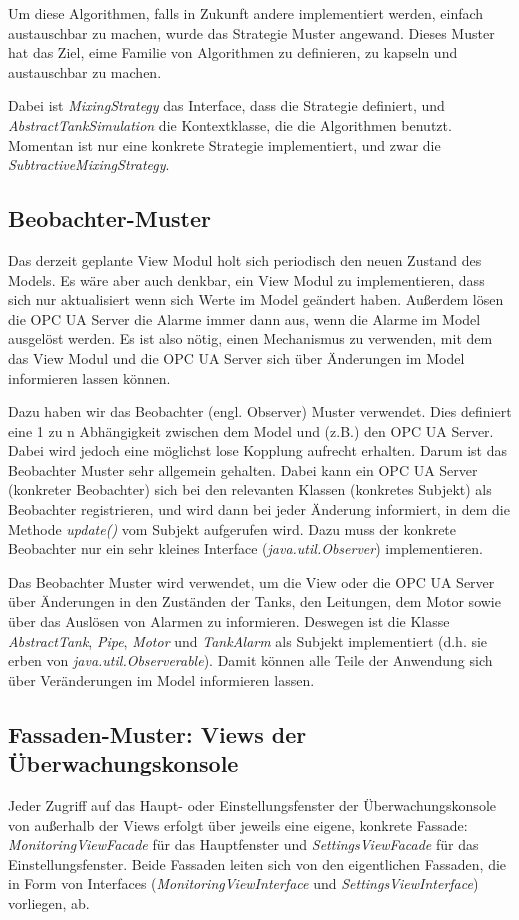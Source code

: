 \documentclass[parskip=full]{scrartcl}
\begin{document}
Um diese Algorithmen, falls in Zukunft andere implementiert werden, einfach austauschbar zu machen, wurde
das Strategie Muster angewand. Dieses Muster hat das Ziel, eime Familie von Algorithmen zu definieren, zu kapseln und austauschbar zu machen.

Dabei ist \emph{MixingStrategy} das Interface, dass die Strategie definiert, und \emph{AbstractTankSimulation} die Kontextklasse, die die Algorithmen
benutzt. Momentan ist nur eine konkrete Strategie implementiert, und zwar die \emph{SubtractiveMixingStrategy}.

\subsection{Beobachter-Muster}
Das derzeit geplante View Modul holt sich periodisch den neuen Zustand des Models. Es wäre aber auch denkbar, ein View Modul zu implementieren,
dass sich nur aktualisiert wenn sich Werte im Model geändert haben. Außerdem lösen die OPC UA Server die Alarme immer dann aus, wenn die Alarme im Model
ausgelöst werden. Es ist also nötig, einen Mechanismus zu verwenden, mit dem das View Modul und die OPC UA Server sich über Änderungen im Model informieren
lassen können.

Dazu haben wir das Beobachter (engl. Observer) Muster verwendet. Dies definiert eine 1 zu n Abhängigkeit zwischen dem Model und (z.B.) den OPC UA Server.
Dabei wird jedoch eine möglichst lose Kopplung aufrecht erhalten. Darum ist das Beobachter Muster sehr allgemein gehalten. Dabei kann ein OPC UA Server (konkreter Beobachter)
sich bei den relevanten Klassen (konkretes Subjekt) als Beobachter registrieren, und wird dann bei jeder Änderung informiert, in dem die Methode \emph{update()}
vom Subjekt aufgerufen wird. Dazu muss der konkrete Beobachter nur ein sehr kleines Interface (\emph{java.util.Observer}) implementieren.

Das Beobachter Muster wird verwendet, um die View oder die OPC UA Server über Änderungen in den Zuständen der Tanks, den Leitungen, dem Motor sowie über
das Auslösen von Alarmen zu informieren. Deswegen ist die Klasse \emph{AbstractTank}, \emph{Pipe}, \emph{Motor} und \emph{TankAlarm} als Subjekt implementiert
(d.h. sie erben von \emph{java.util.Observerable}). Damit können alle Teile der Anwendung sich über Veränderungen im Model informieren lassen.

\subsection{Fassaden-Muster: Views der Überwachungskonsole}
Jeder Zugriff auf das Haupt- oder Einstellungsfenster der Überwachungskonsole von außerhalb der Views erfolgt über jeweils eine eigene, konkrete Fassade: \emph{MonitoringViewFacade} für das Hauptfenster und \emph{SettingsViewFacade} für das Einstellungsfenster. Beide Fassaden leiten sich von den eigentlichen Fassaden, die in Form von Interfaces (\emph{MonitoringViewInterface} und \emph{SettingsViewInterface}) vorliegen, ab.
\end{document}
